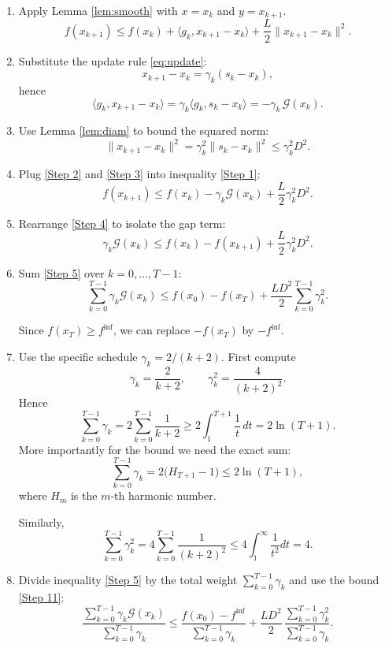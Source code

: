 \documentclass{article}
\newcommand{\inner}[2]{\langle #1,#2\rangle}
\begin{document}
\begin{enumerate}
\item[Step 1.] Apply Lemma \ref{lem:smooth} with $x=x_{k}$ and $y=x_{k+1}$.
\[
f(x_{k+1})\le f(x_{k})+\inner{g_{k}}{x_{k+1}-x_{k}}+\frac{L}{2}\|x_{k+1}-x_{k}\|^{2}. \tag{4}
\]

\item[Step 2.] Substitute the update rule \eqref{eq:update}:
\[
x_{k+1}-x_{k}= \gamma_{k}(s_{k}-x_{k}),
\]
hence
\[
\inner{g_{k}}{x_{k+1}-x_{k}}= \gamma_{k}\inner{g_{k}}{s_{k}-x_{k}}
               = -\gamma_{k}\,\mathcal{G}(x_{k}) . \tag{5}
\]

\item[Step 3.] Use Lemma \ref{lem:diam} to bound the squared norm:
\[
\|x_{k+1}-x_{k}\|^{2}= \gamma_{k}^{2}\|s_{k}-x_{k}\|^{2}
                  \le \gamma_{k}^{2}D^{2}. \tag{6}
\]

\item[Step 4.] Plug \eqref{Step 2} and \eqref{Step 3} into inequality \eqref{Step 1}:
\[
f(x_{k+1})\le f(x_{k}) -\gamma_{k}\mathcal{G}(x_{k})
            +\frac{L}{2}\gamma_{k}^{2}D^{2}. \tag{7}
\]

\item[Step 5.] Rearrange \eqref{Step 4} to isolate the gap term:
\[
\gamma_{k}\mathcal{G}(x_{k})
   \le f(x_{k})-f(x_{k+1}) + \frac{L}{2}\gamma_{k}^{2}D^{2}. \tag{8}
\]

\item[Step 6.] Sum \eqref{Step 5} over $k=0,\dots,T-1$:
\[
\sum_{k=0}^{T-1}\gamma_{k}\mathcal{G}(x_{k})
   \le f(x_{0})-f(x_{T}) + \frac{L D^{2}}{2}\sum_{k=0}^{T-1}\gamma_{k}^{2}. \tag{9}
\]

Since $f(x_{T})\ge f^{\inf}$, we can replace $-f(x_{T})$ by $-f^{\inf}$.

\item[Step 7.] Use the specific schedule $\gamma_{k}=2/(k+2)$. First compute
\[
\gamma_{k} = \frac{2}{k+2},\qquad
\gamma_{k}^{2}= \frac{4}{(k+2)^{2}} .
\]
Hence
\[
\sum_{k=0}^{T-1}\gamma_{k}
   = 2\sum_{k=0}^{T-1}\frac{1}{k+2}
   \ge 2\int_{1}^{T+1}\frac{1}{t}\,dt
   = 2\ln(T+1). \tag{10}
\]
More importantly for the bound we need the exact sum:
\[
\sum_{k=0}^{T-1}\gamma_{k}
   = 2\bigl(H_{T+1}-1\bigr) \le 2\ln(T+1), 
\]
where $H_{m}$ is the $m$‑th harmonic number.  

Similarly,
\[
\sum_{k=0}^{T-1}\gamma_{k}^{2}
   = 4\sum_{k=0}^{T-1}\frac{1}{(k+2)^{2}}
   \le 4\int_{1}^{\infty}\frac{1}{t^{2}}dt
   = 4. \tag{11}
\]

\item[Step 8.] Divide inequality \eqref{Step 5} by the total weight $\sum_{k=0}^{T-1}\gamma_{k}$ and use the bound \eqref{Step 11}:
\[
\frac{\sum_{k=0}^{T-1}\gamma_{k}\mathcal{G}(x_{k})}{\sum_{k=0}^{T-1}\gamma_{k}}
   \le \frac{f(x_{0})-f^{\inf}}{\sum_{k=0}^{T-1}\gamma_{k}}
        + \frac{L D^{2}}{2}\,\frac{\sum_{k=0}^{T-1}\gamma_{k}^{2}}{\sum_{k=0}^{T-1}\gamma_{k}}.
\tag{12}
\]


\end{enumerate}
\end{document}
